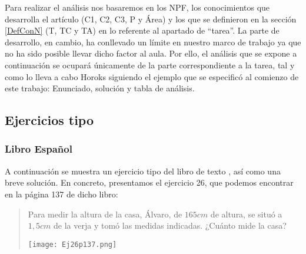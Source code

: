 	Para realizar el análisis nos basaremos en los NPF, los conocimientos que desarrolla el artículo (C1, C2, C3, P y Área) y los que se definieron en la sección \ref{DefConN} (T, TC y TA) en lo referente al apartado de ``tarea''. La parte de desarrollo, en cambio, ha conllevado un límite en nuestro marco de trabajo ya que no ha sido posible llevar dicho factor al aula. Por ello, el análisis que se expone a continuación se ocupará únicamente de la parte correspondiente a la tarea, tal y como lo lleva a cabo Horoks siguiendo el ejemplo que se especificó al comienzo de este trabajo: Enunciado, solución y tabla de análisis. %
	
\subsection{Ejercicios tipo}

\subsubsection*{Libro Español}
	A continuación se muestra un ejercicio tipo del libro de texto \citet{spa}, así como una breve solución. En concreto, presentamos el ejercicio 26, que podemos encontrar en la página 137 de dicho libro:%
	
	\begin{quote}\small
	\begin{multicols}{2}
		\begin{minipage}{7cm}
		\begin{flushleft}
			Para medir la altura de la casa, Álvaro, de $165cm$ de altura, se situó a $1,5cm$ de la verja y tomó las medidas indicadas. ¿Cuánto mide la casa?
		\end{flushleft}
		\end{minipage}
		
	\columnbreak
	
	\begin{flushright}
		\texttt{[image: Ej26p137.png]}
	\end{flushright}
	\end{multicols}
	\end{quote}
	
